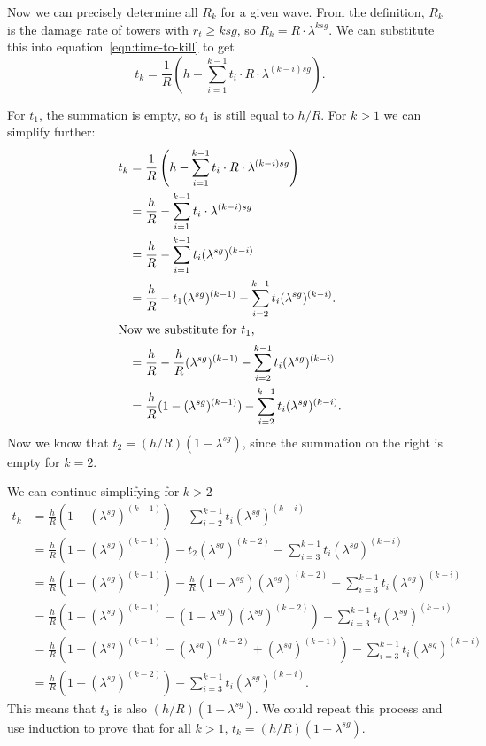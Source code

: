 Now we can precisely determine all $R_k$ for a given wave.
From the definition, $R_k$ is the damage rate of towers with $r_t \geq ksg$, so $R_k = R \cdot \lambda^{ksg}$.
We can substitute this into equation~\ref{eqn:time-to-kill} to get
\begin{equation*}
    t_k = \frac{1}{R}\left(h - \sum_{i=1}^{k-1} t_i \cdot R \cdot \lambda^{(k-i)sg}\right).
\end{equation*}

For $t_1$, the summation is empty, so $t_1$ is still equal to $h/R$.
For $k > 1$ we can simplify further:
\begin{align*}
    t_k & = \frac{1}{R}\left(h - \sum_{i=1}^{k-1} t_i \cdot R \cdot \lambda^{(k-i)sg} \right)              \\
        & = \frac{h}{R} - \sum_{i=1}^{k-1} t_i \cdot \lambda^{(k-i)sg}                                     \\
        & = \frac{h}{R} - \sum_{i=1}^{k-1} t_i (\lambda^{sg})^{(k-i)}                                      \\
        & = \frac{h}{R} - t_1 (\lambda^{sg})^{(k-1)} - \sum_{i=2}^{k-1} t_i (\lambda^{sg})^{(k-i)}.        \\
    \intertext{Now we substitute for $t_1$,}
        & = \frac{h}{R} - \frac{h}{R} (\lambda^{sg})^{(k-1)} - \sum_{i=2}^{k-1} t_i (\lambda^{sg})^{(k-i)} \\
        & = \frac{h}{R} (1 - (\lambda^{sg})^{(k-1)}) - \sum_{i=2}^{k-1} t_i (\lambda^{sg})^{(k-i)}.
\end{align*}
Now we know that $t_2 = (h/R)(1 - \lambda^{sg})$, since the summation on the right is empty for $k=2$.

We can continue simplifying for $k > 2$
\begin{align*}
    t_k & = \frac{h}{R} (1 - (\lambda^{sg})^{(k-1)}) - \sum_{i=2}^{k-1} t_i (\lambda^{sg})^{(k-i)}                                                         \\
        & = \frac{h}{R} (1 - (\lambda^{sg})^{(k-1)}) - t_2 (\lambda^{sg})^{(k-2)} - \sum_{i=3}^{k-1} t_i (\lambda^{sg})^{(k-i)}                            \\
        & = \frac{h}{R} (1 - (\lambda^{sg})^{(k-1)}) - \frac{h}{R} (1 - \lambda^{sg}) (\lambda^{sg})^{(k-2)} - \sum_{i=3}^{k-1} t_i (\lambda^{sg})^{(k-i)} \\
        & = \frac{h}{R} (1 - (\lambda^{sg})^{(k-1)} - (1 - \lambda^{sg}) (\lambda^{sg})^{(k-2)}) - \sum_{i=3}^{k-1} t_i (\lambda^{sg})^{(k-i)}             \\
        & = \frac{h}{R} (1 - (\lambda^{sg})^{(k-1)} - (\lambda^{sg})^{(k-2)} + (\lambda^{sg})^{(k-1)}) - \sum_{i=3}^{k-1} t_i (\lambda^{sg})^{(k-i)}       \\
        & = \frac{h}{R} (1 - (\lambda^{sg})^{(k-2)}) - \sum_{i=3}^{k-1} t_i (\lambda^{sg})^{(k-i)}.
\end{align*}
This means that $t_3$ is also $(h/R)(1 - \lambda^{sg})$.
We could repeat this process and use induction to prove that for all $k > 1$, $t_k = (h/R)(1 - \lambda^{sg})$.


